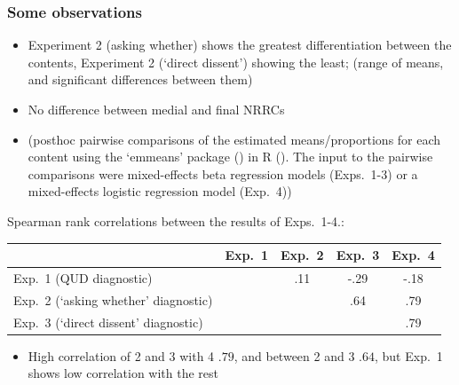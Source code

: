 \documentclass[compress, xcolor = dvipsnames, aspectratio=169]{beamer}
\begin{document}
	\begin{frame}[t]\frametitle{Some observations}\scriptsize
		\begin{itemize}
			\item Experiment 2 (asking whether) shows the greatest differentiation between the contents, Experiment 2 (`direct dissent') showing the least; (range of means, and significant differences between them)

			\item No difference between medial and final NRRCs

			\item  (posthoc pairwise comparisons of the estimated means/proportions for each content using the `emmeans' package (\citealt{emmeans}) in R (\citealt{r}). The input to the pairwise comparisons were mixed-effects beta regression models (Exps.~1-3) or a mixed-effects logistic regression model (Exp.~4))

		\end{itemize}
	
		Spearman rank correlations between the results of Exps.~1-4.:
		\begin{center}
			\begin{tabular}{l | c c c c}
		    & Exp.~1 & Exp.~2 & Exp.~3 & Exp.~4 \\ \hline
		    Exp.~1 (QUD diagnostic) & \cellcolor{lightgray} & .11 & -.29 & -.18 \\
		    Exp.~2 (`asking whether' diagnostic) & \cellcolor{lightgray} & \cellcolor{lightgray} & .64 &.79 \\
		    Exp.~3 (`direct dissent' diagnostic) & \cellcolor{lightgray}& \cellcolor{lightgray} & \cellcolor{lightgray} & .79  \\
		    \hline
		    \end{tabular}
		\end{center}
		
		  \begin{itemize}
		  	\item High correlation of 2 and 3 with 4 $.79$, and between 2 and 3 $.64$, but Exp.~1 shows low correlation with the rest
		  \end{itemize}
	
	\end{frame}
\end{document}
